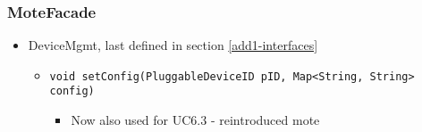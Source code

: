     \subsubsection{MoteFacade}
        \begin{itemize}
            \item DeviceMgmt, last defined in section \ref{add1-interfaces}
            \begin{itemize}
                \item \texttt{void setConfig(PluggableDeviceID pID, Map<String, String> config)}
                \begin{itemize}
                    \item Now also used for UC6.3 - reintroduced mote
                \end{itemize}
            \end{itemize}
        \end{itemize}

